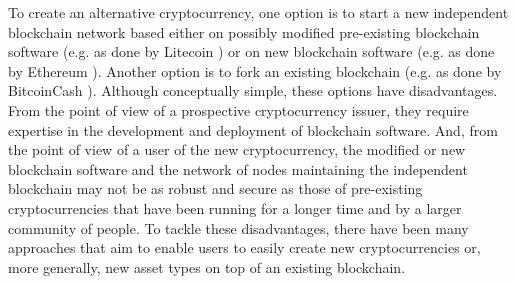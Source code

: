 \documentclass{llncs}
\begin{document}
To create an alternative cryptocurrency, one option is to start a new independent blockchain network based either on possibly modified pre-existing blockchain software (e.g. as done by Litecoin \cite{Litecoin}) or on new blockchain software (e.g. as done by Ethereum \cite{EthereumWhitePaper,EthereumYellowPaper}). Another option is to fork an existing blockchain (e.g. as done by BitcoinCash \cite{BitcoinCash}). Although conceptually simple, these options have disadvantages. From the point of view of a prospective cryptocurrency issuer, they require expertise in the development and deployment of blockchain software. And, from the point of view of a user of the new cryptocurrency, the modified or new blockchain software and the network of nodes maintaining the independent blockchain may not be as robust and secure as those of pre-existing cryptocurrencies that have been running for a longer time and by a larger community of people. To tackle these disadvantages, there have been many approaches that aim to enable users to easily create new cryptocurrencies or, more generally, new asset types on top of an existing blockchain.
\end{document}
